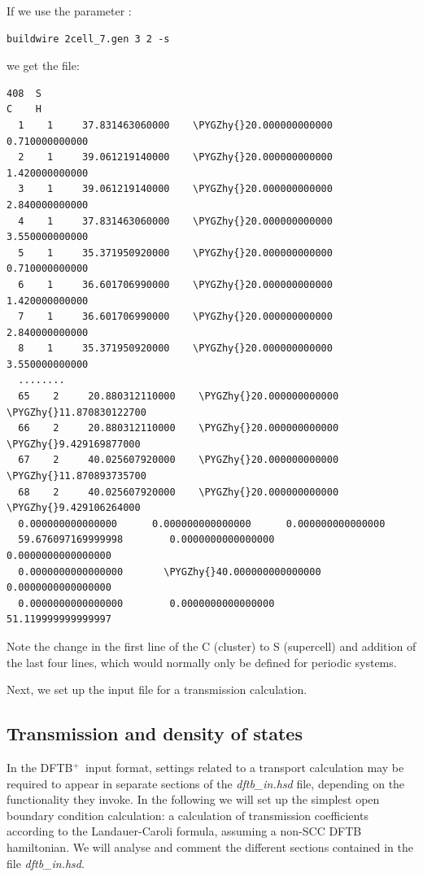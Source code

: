 \documentclass[a4paper,11pt,english]{sphinxmanual}
\newcommand{\dftbp}{\textsf{DFTB$^{\text{+}}$\ }} %
\def\PYGZhy{\char`\-}
\begin{document}
{{If we use the parameter :

\begin{Verbatim}[commandchars=\\\{\}]
  buildwire 2cell_7.gen 3 2 -s
\end{Verbatim}
%
we get the file:
%
\begin{Verbatim}[commandchars=\\\{\}]
408  S
C    H
  1    1     37.831463060000    \PYGZhy{}20.000000000000      0.710000000000
  2    1     39.061219140000    \PYGZhy{}20.000000000000      1.420000000000
  3    1     39.061219140000    \PYGZhy{}20.000000000000      2.840000000000
  4    1     37.831463060000    \PYGZhy{}20.000000000000      3.550000000000
  5    1     35.371950920000    \PYGZhy{}20.000000000000      0.710000000000
  6    1     36.601706990000    \PYGZhy{}20.000000000000      1.420000000000
  7    1     36.601706990000    \PYGZhy{}20.000000000000      2.840000000000
  8    1     35.371950920000    \PYGZhy{}20.000000000000      3.550000000000
  ........
  65    2     20.880312110000    \PYGZhy{}20.000000000000    \PYGZhy{}11.870830122700
  66    2     20.880312110000    \PYGZhy{}20.000000000000     \PYGZhy{}9.429169877000
  67    2     40.025607920000    \PYGZhy{}20.000000000000    \PYGZhy{}11.870893735700
  68    2     40.025607920000    \PYGZhy{}20.000000000000     \PYGZhy{}9.429106264000
  0.000000000000000      0.000000000000000      0.000000000000000
  59.676097169999998        0.0000000000000000        0.0000000000000000
  0.0000000000000000       \PYGZhy{}40.000000000000000        0.0000000000000000
  0.0000000000000000        0.0000000000000000        51.119999999999997
\end{Verbatim}
%
Note the change in the first line of the C (cluster) to S (supercell) and
addition of the last four lines, which would normally only be defined for periodic systems.

Next, we set up the input file for a transmission calculation.

\subsection{Transmission and density of states}
\label{transport:transmission-and-density-of-states}
In the \dftbp input format, settings related to a transport
calculation may be required to appear in separate sections of the
\emph{dftb\_in.hsd} file, depending on the functionality they invoke. In the
following we will set up the simplest open boundary condition
calculation: a calculation of transmission coefficients according to
the Landauer-Caroli formula, assuming a non-SCC DFTB hamiltonian. We
will analyse and comment the different sections contained in the file
\emph{dftb\_in.hsd}.

}}
\end{document}
